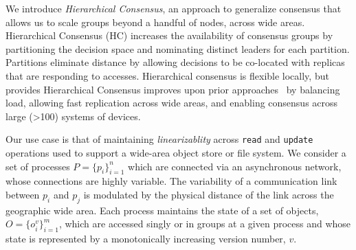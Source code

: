 \documentclass[11pt,letterpaper]{article}
\begin{document}
% 


We introduce \emph{Hierarchical Consensus}, an approach to generalize
consensus that allows us to scale groups beyond a handful of nodes, across wide areas.
Hierarchical Consensus (HC) increases the availability of consensus groups by
partitioning the decision space and nominating distinct leaders for each partition.
Partitions eliminate distance by allowing decisions to be co-located with replicas that
are responding to accesses. Hierarchical consensus is flexible locally, but provides
Hierarchical Consensus
improves upon prior
approaches~\cite{lamport_paxos_2001,2016arXiv160806696H,biely_s-paxos:_2012,mao_mencius:_2008,moraru_there_2013,kraska_mdcc:_2013}
by balancing load, allowing fast replication across wide areas, and enabling
consensus across large (\textgreater 100) systems of devices.

Our use case is that of maintaining \emph{linearizablity} across
\texttt{read} and \texttt{update} operations used to support a wide-area
object store or file system.
% 
% 
We consider a set of processes $P = \{p_i\}_{i=1}^n$ which are connected via
an asynchronous network, whose connections are highly variable.
The variability of a communication link between $p_i$ and $p_j$ is modulated
by the physical distance of the link across the geographic wide area.
Each process maintains the state of a set of objects, $O = \{o_i^v\}_{i=1}^m$,
which are accessed singly or in groups at a given process and whose state is
represented by a monotonically increasing version number, $v$.
\end{document}
